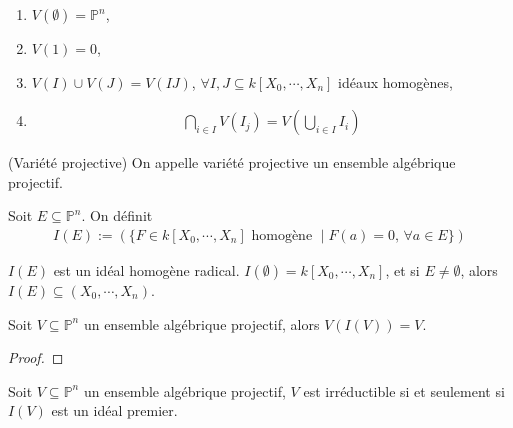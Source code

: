         \begin{prop}
            \begin{enumerate}
                \item $V(\emptyset) = \mathbb{P}^n$,
                \item $V(1) = 0$,
                \item $V(I) \cup V(J) = V(IJ)$, $\forall I,J \subseteq k[X_0, \cdots, X_n]$ idéaux homogènes,
                \item \begin{align*}
                    \bigcap_{i \in I} V(I_j) = V\left( \bigcup_{i \in I} I_i \right)
                \end{align*}
            \end{enumerate}
        \end{prop}
        \begin{defi} (Variété projective)
            On appelle variété projective un ensemble algébrique projectif.
        \end{defi}
        \begin{defi}
            Soit $E \subseteq \mathbb{P}^n$. On définit 
            \begin{align*}
                I(E) := (\{F \in k[X_0, \cdots, X_n] \text{ homogène } \mid F(a) = 0,\, \forall a \in E\})
            \end{align*}
        \end{defi}
        \begin{exo}
            $I(E)$ est un idéal homogène radical. $I(\emptyset) = k[X_0, \cdots, X_n]$, et si $E \neq \emptyset$, alors $I(E) \subseteq (X_0, \cdots, X_n)$.
        \end{exo}
        \begin{prop}
            Soit $V \subseteq \mathbb{P}^n$ un ensemble algébrique projectif, alors $V(I(V)) = V$.
        \end{prop}
        \begin{proof}
        \end{proof}
        \begin{prop}
            Soit $V \subseteq \mathbb{P}^n$ un ensemble algébrique projectif, $V$ est irréductible si et seulement si $I(V)$ est un idéal premier.
        \end{prop}
